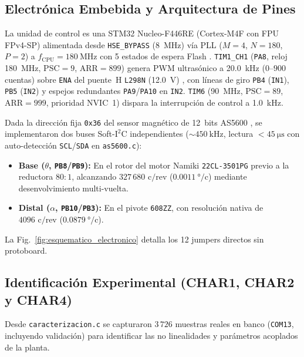 \subsection{Electrónica Embebida y Arquitectura de Pines}\label{subsec:electronica}
La unidad de control es una STM32 Nucleo-F446RE (Cortex-M4F con FPU FPv4-SP) alimentada desde \texttt{HSE\_BYPASS} (\qty{8}{\mega\hertz}) vía PLL ($M=4$, $N=180$, $P=2$) a $f_{\text{CPU}}=\qty{180}{\mega\hertz}$ con 5 estados de espera Flash \cite{STM32F446RE_Datasheet}. \texttt{TIM1\_CH1} (\texttt{PA8}, reloj \qty{180}{\mega\hertz}, $\text{PSC}=9$, $\text{ARR}=899$) genera PWM ultrasónico a \qty{20.0}{\kilo\hertz} ($0\text{--}900$ cuentas) sobre \texttt{ENA} del puente~H \texttt{L298N} (\qty{12.0}{\volt}) \cite{L298N_Datasheet}, con líneas de giro \texttt{PB4} (\texttt{IN1}), \texttt{PB5} (\texttt{IN2}) y espejos redundantes \texttt{PA9}/\texttt{PA10} en \texttt{IN2}. \texttt{TIM6} (\qty{90}{\mega\hertz}, $\text{PSC}=89$, $\text{ARR}=999$, prioridad NVIC~1) dispara la interrupción de control a \qty{1.0}{\kilo\hertz}.

Dada la dirección fija \texttt{0x36} del sensor magnético de 12~bits AS5600 \cite{ams2018}, se implementaron dos buses Soft-$\text{I}^2\text{C}$ independientes ($\sim\qty{450}{\kilo\hertz}$, lectura $< \qty{45}{\micro\second}$ con auto-detección \texttt{SCL}/\texttt{SDA} en \texttt{as5600.c}):
\begin{itemize}
    \item \textbf{Base ($\theta$, \texttt{PB8}/\texttt{PB9}):} En el rotor del motor Namiki \texttt{22CL-3501PG} previo a la reductora $80:1$, alcanzando $327\,680\text{ c/rev}$ ($\qty{0.0011}{\degree}/\text{c}$) mediante desenvolvimiento multi-vuelta.
    \item \textbf{Distal ($\alpha$, \texttt{PB10}/\texttt{PB3}):} En el pivote \texttt{608ZZ}, con resolución nativa de $4096\text{ c/rev}$ ($\qty{0.0879}{\degree}/\text{c}$).
\end{itemize}
La Fig.~\ref{fig:esquematico_electronico} detalla los 12 jumpers directos sin protoboard.



\subsection{Identificación Experimental (CHAR1, CHAR2 y CHAR4)}\label{subsec:identificacion}
Desde \texttt{caracterizacion.c} se capturaron $3\,726$ muestras reales en banco (\texttt{COM13}, incluyendo validación) para identificar las no linealidades y parámetros acoplados de la planta.

